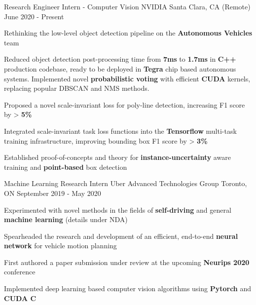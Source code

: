 
\begin{cventries}
  \cventry
    {Research Engineer Intern - Computer Vision} %
    {NVIDIA} %
    {Santa Clara, CA (Remote)} %
    {June 2020 - Present} %
    {
      \begin{cvitems} %
        \item {Rethinking the low-level object detection pipeline on the \textbf{Autonomous Vehicles} team}
        \item {Reduced object detection post-processing time from \textbf{7ms} to \textbf{1.7ms} in \textbf{C++} production codebase, ready to be deployed in \textbf{Tegra} chip based autonomous systems. Implemented novel \textbf{probabilistic voting} with efficient \textbf{CUDA} kernels, replacing popular DBSCAN and NMS methods.}
        \item {Proposed a novel scale-invariant loss for poly-line detection, increasing F1 score by > \textbf{5\%}}
        \item {Integrated scale-invariant task loss functions into the \textbf{Tensorflow} multi-task training infrastructure, improving bounding box F1 score by > \textbf{3\%}}
        \item {Established proof-of-concepts and theory for \textbf{instance-uncertainty} aware training and \textbf{point-based} box detection}
      \end{cvitems}
    }

  \cventry
    {Machine Learning Research Intern} %
    {Uber Advanced Technologies Group} %
    {Toronto, ON} %
    {September 2019 - May 2020} %
    {
      \begin{cvitems} %
        \item {Experimented with novel methods in the fields of \textbf{self-driving} and general \textbf{machine learning} (details under NDA)}
        \item {Spearheaded the research and development of an efficient, end-to-end \textbf{neural network} for vehicle motion planning}
        \item {First authored a paper submission under review at the upcoming \textbf{Neurips 2020} conference}
        \item {Implemented deep learning based computer vision algorithms using \textbf{Pytorch} and \textbf{CUDA C}}
      \end{cvitems}
    }


\end{cventries}

